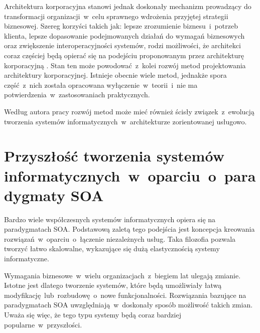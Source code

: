 Architektura korporacyjna stanowi jednak doskonały mechanizm prowadzący do transformacji organizacji~w~celu sprawnego wdrożenia przyjętej strategii biznesowej. Szereg korzyści takich jak: lepsze zrozumienie biznesu~i~potrzeb klienta, lepsze dopasowanie podejmowanych działań do wymagań biznesowych oraz zwiększenie interoperacyjności systemów, rodzi możliwości, że architekci coraz częściej będą opierać się na podejściu proponowanym przez architekturę korporacyjną \cite{ArchKorpAdmPub}. Stan ten może powodować~z~kolei rozwój metod projektowania architektury korporacyjnej. Istnieje obecnie wiele metod, jednakże spora część~z~nich została opracowana wyłączenie~w~teorii~i~nie ma potwierdzenia~w~zastosowaniach praktycznych.

Według autora pracy rozwój metod może mieć również ścisły związek~z~ewolucją tworzenia systemów informatycznych~w~architekturze zorientowanej usługowo.

\section{Przyszłość tworzenia systemów informatycznych~w~oparciu~o~paradygmaty SOA}
Bardzo wiele współczesnych systemów informatycznych opiera się na paradygmatach SOA. Podstawową zaletą tego podejścia jest koncepcja kreowania rozwiązań~w~oparciu~o~łączenie niezależnych usług. Taka filozofia pozwala tworzyć łatwo skalowalne, wykazujące się dużą elastycznością systemy informatyczne. 

Wymagania biznesowe~w~wielu organizacjach~z~biegiem lat ulegają zmianie. Istotne jest dlatego tworzenie systemów, które będą umożliwiały łatwą modyfikację~lub~rozbudowę~o~nowe funkcjonalności. Rozwiązania bazujące na paradygmatach SOA uwzględniają~w~doskonały sposób możliwość takich zmian. Uważa się więc, że tego typu systemy będą coraz bardziej popularne~w~przyszłości.

 